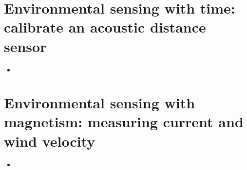 

%	
%	
%	




%


%








\vspace{4cm}



\section{Environmental sensing with time: calibrate an acoustic distance sensor}
\begin{itemize}
	\item  
\end{itemize}

\section{Environmental sensing with magnetism: measuring current and wind velocity}
\begin{itemize}
	\item  
\end{itemize}









